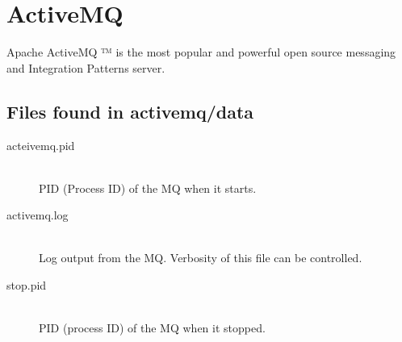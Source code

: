 \section{ActiveMQ}
Apache ActiveMQ ™ is the most popular and powerful open source messaging and Integration Patterns server.

	\subsection{Files found in activemq/data}
	\begin{description}
		\item[acteivemq.pid] \hfill \\
			PID (Process ID) of the MQ when it starts.
		\item[activemq.log] \hfill \\
			Log output from the MQ. Verbosity of this file can be controlled.
		\item[stop.pid] \hfill \\
			PID (process ID) of the MQ when it stopped.
	\end{description}